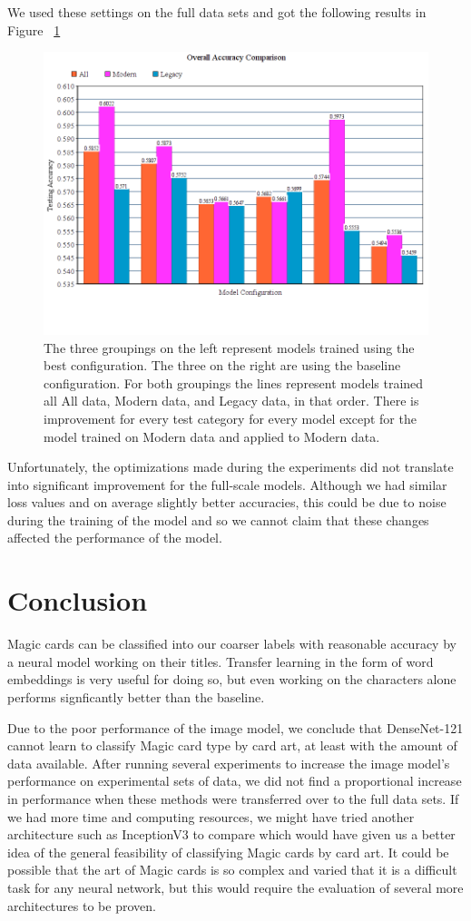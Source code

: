 \documentclass[letterpaper]{article} %
\begin{document}
We used these settings on the full data sets and got the following results in Figure ~\ref{fig:bestoverall}

\begin{figure}
  \includegraphics[width=.45\textwidth]{best-overall}
  \caption{The three groupings on the left represent models trained using the best configuration.
    The three on the right are using the baseline configuration.
    For both groupings the lines represent
    models trained all All data, Modern data, and Legacy data, in that order.
    There is improvement
    for every test category for every model except for the model trained on Modern data
    and applied to Modern data.}
  \label{fig:bestoverall}
\end{figure}

Unfortunately, the optimizations made during the experiments did not translate
into significant improvement for the full-scale models.
Although we had similar loss values and on average slightly better accuracies,
this could be due to
noise during the training of the model and so we cannot claim that these changes
affected the performance of the model.

\section{Conclusion}

Magic cards can be classified into our coarser labels with reasonable accuracy
by a neural model working on their titles.
Transfer learning in the form of word embeddings is very useful for doing so,
but even working on the characters alone performs signficantly better
than the baseline.

Due to the poor performance of the image model,
we conclude that DenseNet-121 cannot learn to classify Magic card type by card art,
at least with the amount of data available.
After running several experiments to increase the image model's
performance on experimental sets of data,
we did not find a proportional increase in performance
when these methods were transferred over to the full data sets.
If we had more time and computing resources,
we might have tried another architecture such as InceptionV3
to compare which would have given us a better idea
of the general feasibility of classifying Magic cards by card art.
It could be possible that the art of
Magic cards is so complex and varied
that it is a difficult task for any neural network,
but this would require the evaluation of several more architectures to be proven.
\end{document}

